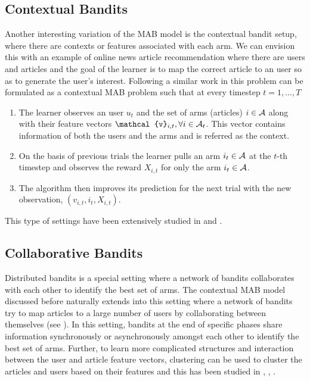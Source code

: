 \subsection{Contextual Bandits}

Another interesting variation of the MAB model is the contextual bandit setup, where there are contexts or features associated with each arm. We can envision this with an example of online news article recommendation where there are users and articles and the goal of the learner is to map the correct article to an user so as to generate the user's  interest. Following a similar work in \citet{langford2008epoch} this problem can be formulated as a contextual MAB problem such that at every timestep $t=1,\ldots,T$
\begin{enumerate}
\item The learner observes an user $u_t$ and the set of arms (articles) $i\in\mathcal{A}$ along with their feature vectors $\mathcal{v}_{i,t},\forall i\in\A_t$. This vector contains information of both the users and the arms and is referred as the context.
\item On the basis of previous trials the learner pulls an arm $i_t\in\mathcal{A}$ at the $t$-th timestep and observes the reward $X_{i,t}$ for only the arm $i_t\in\mathcal{A}$.
\item The algorithm then improves its prediction for the next trial with the new observation, $\left(v_{i,t},i_{t}, X_{i,t} \right)$.
\end{enumerate}
This type of settings have been extensively studied in \citet{li2010contextual} and \citet{beygelzimer2011contextual}.

\subsection{Collaborative Bandits}

Distributed bandits is a special setting where a network of bandits collaborates with each other to identify the best set of arms. The contextual MAB model discussed before naturally extends into this setting where a network of bandits try to map articles to a large number of users by collaborating between themselves (see \citet{awerbuch2008competitive,liu2010distributed,szorenyi2013gossip,hillel2013distributed}). In this setting, bandits at the end of specific phases share information synchronously or asynchronously amongst each other to identify the best set of arms. Further, to learn more complicated structures and interaction between the user and article feature vectors, clustering can be used to cluster the articles and users based on their features and this has been studied in \citet{bui2012clustered}, \citet{cesa2013gang}, \citet{gentile2014online}.


